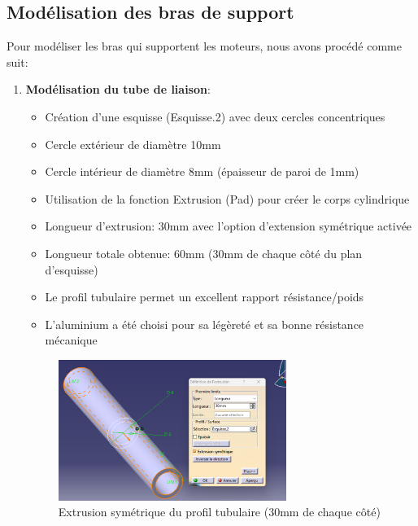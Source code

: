 \documentclass[a4paper,12pt]{report}
\begin{document}
\subsection{Modélisation des bras de support}
Pour modéliser les bras qui supportent les moteurs, nous avons procédé comme suit:
\begin{enumerate}
    \item \textbf{Modélisation du tube de liaison}:
    \begin{itemize}
        \item Création d'une esquisse (Esquisse.2) avec deux cercles concentriques
        \item Cercle extérieur de diamètre 10mm
        \item Cercle intérieur de diamètre 8mm (épaisseur de paroi de 1mm)
        \item Utilisation de la fonction Extrusion (Pad) pour créer le corps cylindrique
        \item Longueur d'extrusion: 30mm avec l'option d'extension symétrique activée
        \item Longueur totale obtenue: 60mm (30mm de chaque côté du plan d'esquisse)
        \item Le profil tubulaire permet un excellent rapport résistance/poids
        \item L'aluminium a été choisi pour sa légèreté et sa bonne résistance mécanique
    \end{itemize}
    
    \begin{figure}[H]
        \centering
        \includegraphics[width=0.7\textwidth]{images/extrusion_tube.png}
        \caption{Extrusion symétrique du profil tubulaire (30mm de chaque côté)}
        \label{fig:extrusion_tube}
    \end{figure}
    

\end{enumerate}
\end{document}
